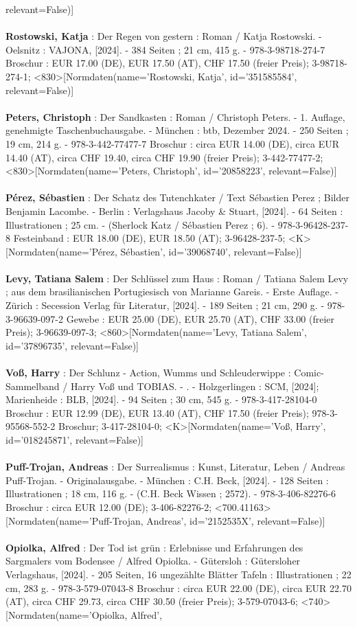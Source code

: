 \documentclass{article}
\begin{document}
\begin{multicols}{3}
relevant=False)]\\\\\textbf{Rostowski, Katja} : Der Regen von gestern : Roman / Katja Rostowski. - Oelsnitz : VAJONA, [2024]. - 384 Seiten ; 21 cm, 415 g. - 978-3-98718-274-7 Broschur : EUR 17.00 (DE), EUR 17.50 (AT), CHF 17.50 (freier Preis); 3-98718-274-1; <830>[Normdaten(name='Rostowski, Katja', id='351585584', relevant=False)]\\\\\textbf{Peters, Christoph} : Der Sandkasten : Roman / Christoph Peters. - 1. Auflage, genehmigte Taschenbuchausgabe. - München : btb, Dezember 2024. - 250 Seiten ; 19 cm, 214 g. - 978-3-442-77477-7 Broschur : circa EUR 14.00 (DE), circa EUR 14.40 (AT), circa CHF 19.40, circa CHF 19.90 (freier Preis); 3-442-77477-2; <830>[Normdaten(name='Peters, Christoph', id='20858223', relevant=False)]\\\\\textbf{Pérez, Sébastien} : Der Schatz des Tutenchkater / Text Sébastien Perez ; Bilder Benjamin Lacombe. - Berlin : Verlagshaus Jacoby \& Stuart, [2024]. - 64 Seiten : Illustrationen ; 25 cm. - (Sherlock Katz / Sébastien Perez ; 6). - 978-3-96428-237-8 Festeinband : EUR 18.00 (DE), EUR 18.50 (AT); 3-96428-237-5; <K>[Normdaten(name='Pérez, Sébastien', id='39068740', relevant=False)]\\\\\textbf{Levy, Tatiana Salem} : Der Schlüssel zum Haus : Roman / Tatiana Salem Levy ; aus dem brasilianischen Portugiesisch von Marianne Gareis. - Erste Auflage. - Zürich : Secession Verlag für Literatur, [2024]. - 189 Seiten ; 21 cm, 290 g. - 978-3-96639-097-2 Gewebe : EUR 25.00 (DE), EUR 25.70 (AT), CHF 33.00 (freier Preis); 3-96639-097-3; <860>[Normdaten(name='Levy, Tatiana Salem', id='37896735', relevant=False)]\\\\\textbf{Voß, Harry} : Der Schlunz - Action, Wumms und Schleuderwippe : Comic-Sammelband / Harry Voß und TOBIAS. - . - Holzgerlingen : SCM, [2024]; Marienheide : BLB, [2024]. - 94 Seiten ; 30 cm, 545 g. - 978-3-417-28104-0 Broschur : EUR 12.99 (DE), EUR 13.40 (AT), CHF 17.50 (freier Preis); 978-3-95568-552-2 Broschur; 3-417-28104-0; <K>[Normdaten(name='Voß, Harry', id='018245871', relevant=False)]\\\\\textbf{Puff-Trojan, Andreas} : Der Surrealismus : Kunst, Literatur, Leben / Andreas Puff-Trojan. - Originalausgabe. - München : C.H. Beck, [2024]. - 128 Seiten : Illustrationen ; 18 cm, 116 g. - (C.H. Beck Wissen ; 2572). - 978-3-406-82276-6 Broschur : circa EUR 12.00 (DE); 3-406-82276-2; <700.41163>[Normdaten(name='Puff-Trojan, Andreas', id='2152535X', relevant=False)]\\\\\textbf{Opiolka, Alfred} : Der Tod ist grün : Erlebnisse und Erfahrungen des Sargmalers vom Bodensee / Alfred Opiolka. - Gütersloh : Gütersloher Verlagshaus, [2024]. - 205 Seiten, 16 ungezählte Blätter Tafeln : Illustrationen ; 22 cm, 283 g. - 978-3-579-07043-8 Broschur : circa EUR 22.00 (DE), circa EUR 22.70 (AT), circa CHF 29.73, circa CHF 30.50 (freier Preis); 3-579-07043-6; <740>[Normdaten(name='Opiolka, Alfred', 
\end{multicols}
\end{document}
